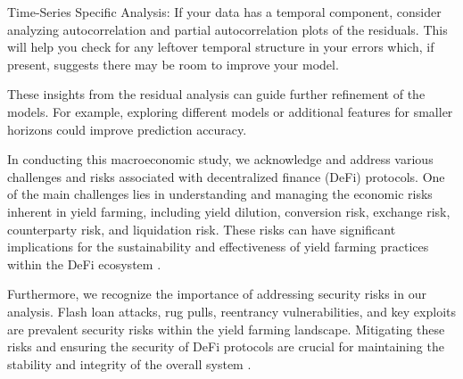 \documentclass{article}
\begin{document}

Time-Series Specific Analysis: If your data has a temporal component, consider analyzing autocorrelation and partial autocorrelation plots of the residuals. This will help you check for any leftover temporal structure in your errors which, if present, suggests there may be room to improve your model.

These insights from the residual analysis can guide further refinement of the models. For example, exploring different models or additional features for smaller horizons could improve prediction accuracy.


In conducting this macroeconomic study, we acknowledge and address various challenges and risks associated with decentralized finance (DeFi) protocols. One of the main challenges lies in understanding and managing the economic risks inherent in yield farming, including yield dilution, conversion risk, exchange risk, counterparty risk, and liquidation risk. These risks can have significant implications for the sustainability and effectiveness of yield farming practices within the DeFi ecosystem \cite{Xu2023}.

Furthermore, we recognize the importance of addressing security risks in our analysis. Flash loan attacks, rug pulls, reentrancy vulnerabilities, and key exploits are prevalent security risks within the yield farming landscape. Mitigating these risks and ensuring the security of DeFi protocols are crucial for maintaining the stability and integrity of the overall system \cite{Xu2023}.


\end{document}
